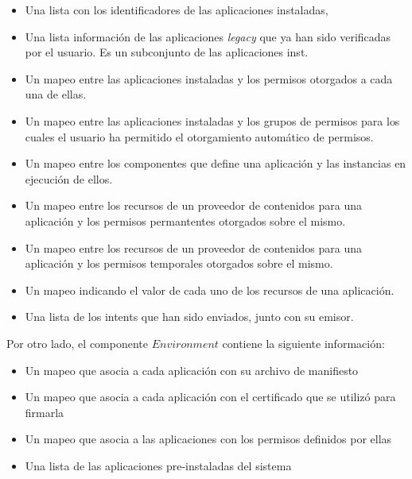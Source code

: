 \begin{itemize}
    \item Una lista con los identificadores de las aplicaciones instaladas,
    \item Una lista  información de las aplicaciones \textit{legacy} que ya han sido verificadas por
    el usuario. Es un subconjunto de las aplicaciones inst.
    \item Un mapeo entre las aplicaciones instaladas y los permisos otorgados a cada una de ellas.
    \item Un mapeo entre las aplicaciones instaladas y los grupos de permisos para los cuales el
    usuario ha permitido el otorgamiento automático de permisos. 
    \item Un mapeo entre los componentes que define una aplicación y las instancias en ejecución de
    ellos.
    \item Un mapeo entre los recursos de un proveedor de contenidos para una aplicación y los permisos
    permantentes otorgados sobre el mismo.
    \item Un mapeo entre los recursos de un proveedor de contenidos para una aplicación y los permisos
    temporales otorgados sobre el mismo.
    \item Un mapeo indicando el valor de cada uno de los recursos de una aplicación.
    \item Una lista de los intents que han sido enviados, junto con su emisor.
\end{itemize}

Por otro lado, el componente $Environment$ contiene la siguiente información:

\begin{itemize}
    \item Un mapeo que asocia a cada aplicación con su archivo de manifiesto
    \item Un mapeo que asocia a cada aplicación con el certificado que se utilizó para firmarla
    \item Un mapeo que asocia a las aplicaciones con los permisos definidos por ellas
    \item Una lista de las aplicaciones pre-instaladas del sistema
\end{itemize}

